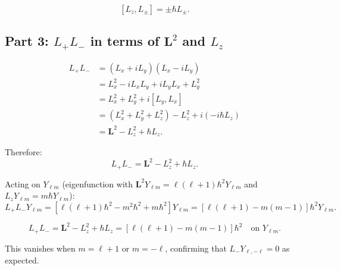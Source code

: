 \documentclass[12pt]{article}
\begin{document}
\[
\boxed{[L_z, L_\pm] = \pm\hbar L_\pm.}
\]

\subsection*{Part 3: $L_+L_-$ in terms of $\mathbf{L}^2$ and $L_z$}

\begin{align}
L_+L_- &= (L_x + iL_y)(L_x - iL_y) \\
&= L_x^2 - iL_xL_y + iL_yL_x + L_y^2 \\
&= L_x^2 + L_y^2 + i[L_y, L_x] \\
&= (L_x^2 + L_y^2 + L_z^2) - L_z^2 + i(-i\hbar L_z) \\
&= \mathbf{L}^2 - L_z^2 + \hbar L_z.
\end{align}

Therefore:
\[
L_+L_- = \mathbf{L}^2 - L_z^2 + \hbar L_z.
\]

Acting on $Y_{\ell m}$ (eigenfunction with $\mathbf{L}^2 Y_{\ell m} = \ell(\ell+1)\hbar^2 Y_{\ell m}$ and $L_z Y_{\ell m} = m\hbar Y_{\ell m}$):
\[
L_+L_- Y_{\ell m} = [\ell(\ell+1)\hbar^2 - m^2\hbar^2 + m\hbar^2]Y_{\ell m} = [\ell(\ell+1) - m(m-1)]\hbar^2 Y_{\ell m}.
\]

\[
\boxed{L_+L_- = \mathbf{L}^2 - L_z^2 + \hbar L_z = [\ell(\ell+1) - m(m-1)]\hbar^2 \quad \text{on } Y_{\ell m}.}
\]

This vanishes when $m = \ell+1$ or $m = -\ell$, confirming that $L_- Y_{\ell,-\ell} = 0$ as expected.
\end{document}
